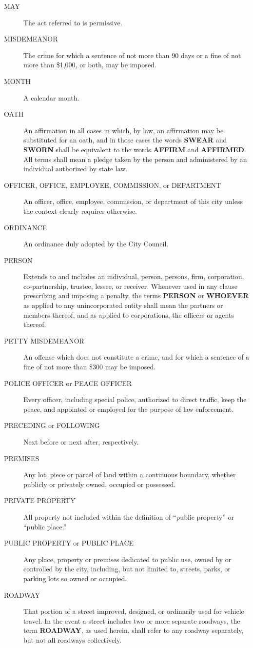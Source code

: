 \begin{description}
\item[MAY] The act referred to is permissive.
\item[MISDEMEANOR] The crime for which a sentence of not more than 90 days or a fine of not more than \$1,000, or both, may be imposed.
\item[MONTH] A calendar month.
\item[OATH] An affirmation in all cases in which, by law, an affirmation may be substituted for an oath, and in those cases the words \textbf{SWEAR} and \textbf{SWORN} shall be equivalent to the words \textbf{AFFIRM} and \textbf{AFFIRMED}.  All terms shall mean a pledge taken by the person and administered by an individual authorized by state law.
\item[OFFICER, OFFICE, EMPLOYEE, COMMISSION, or DEPARTMENT] An officer, office, employee, commission, or department of this city unless the context clearly requires otherwise.
\item[ORDINANCE] An ordinance duly adopted by the City Council.
\item[PERSON] Extends to and includes an individual, person, persons, firm, corporation, co-partnership, trustee, lessee, or receiver.  Whenever used in any clause prescribing and imposing a penalty, the terms \textbf{PERSON} or \textbf{WHOEVER} as applied to any unincorporated entity shall mean the partners or members thereof, and as applied to corporations, the officers or agents thereof.
\item[PETTY MISDEMEANOR] An offense which does not constitute a crime, and for which a sentence of a fine of not more than \$300 may be imposed.
\item[POLICE OFFICER or PEACE OFFICER] Every officer, including special police, authorized to direct traffic, keep the peace, and appointed or employed for the purpose of law enforcement.
\item[PRECEDING or FOLLOWING] Next before or next after, respectively.
\item[PREMISES] Any lot, piece or parcel of land within a continuous boundary, whether publicly or privately owned, occupied or possessed.
\item[PRIVATE PROPERTY] All property not included within the definition of “public property” or “public place.”
\item[PUBLIC PROPERTY or PUBLIC PLACE] Any place, property or premises dedicated to public use, owned by or controlled by the city, including, but not limited to, streets, parks, or parking lots so owned or occupied.
\item[ROADWAY] That portion of a street improved, designed, or ordinarily used for vehicle travel.  In the event a street includes two or more separate roadways, the term \textbf{ROADWAY}, as used herein, shall refer to any roadway separately, but not all roadways collectively.

\end{description}
